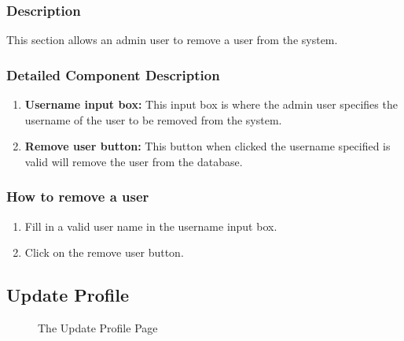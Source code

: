 \documentclass[14pt, a4paper]{article}
\begin{document}
	\subsubsection{Description} This section allows an admin user to remove a user from the system.
	\subsubsection{Detailed Component Description}
		\begin{enumerate}
			\item \textbf{Username input box:} This input box is where the admin user specifies the username of the user to be removed from the system.
			\item \textbf{Remove user button:} This button when clicked the username specified is valid will remove the user from the database.
		\end{enumerate}
	\subsubsection{How to remove a user}
		\begin{enumerate}
			\item Fill in a valid user name in the username input box.
			\item Click on the remove user button.
		\end{enumerate}
\subsection{Update Profile}
	\begin{figure}[H]
		\centerline{}
		\caption{The Update Profile Page}
		\label{fig:updateProf1}
	\end{figure}
\end{document}
